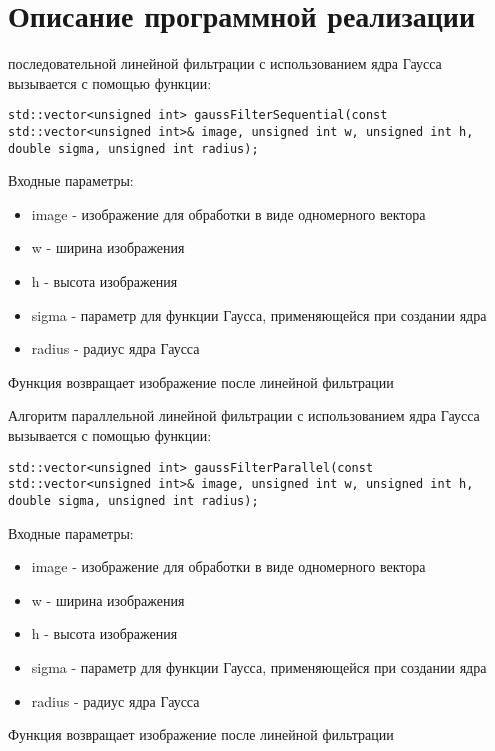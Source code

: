 \documentclass{report}
\begin{document}
\section*{Описание программной реализации}
 последовательной линейной фильтрации с использованием ядра Гаусса вызывается с помощью функции:
\begin{lstlisting}
std::vector<unsigned int> gaussFilterSequential(const std::vector<unsigned int>& image, unsigned int w, unsigned int h, double sigma, unsigned int radius);
\end{lstlisting}
\par Входные параметры:
\begin{itemize}
\item image - изображение для обработки в виде одномерного вектора
\item w - ширина изображения
\item h - высота изображения
\item sigma - параметр для функции Гаусса, применяющейся при создании ядра
\item radius - радиус ядра Гаусса
\end{itemize}

\par Функция возвращает изображение после линейной фильтрации

\par Алгоритм параллельной линейной фильтрации с использованием ядра Гаусса вызывается с помощью функции:
\begin{lstlisting}
std::vector<unsigned int> gaussFilterParallel(const std::vector<unsigned int>& image, unsigned int w, unsigned int h, double sigma, unsigned int radius);
\end{lstlisting}
\par Входные параметры:
\begin{itemize}
\item image - изображение для обработки в виде одномерного вектора
\item w - ширина изображения
\item h - высота изображения
\item sigma - параметр для функции Гаусса, применяющейся при создании ядра
\item radius - радиус ядра Гаусса
\end{itemize}

\par Функция возвращает изображение после линейной фильтрации
\end{document}

